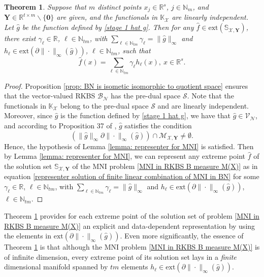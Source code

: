 \documentclass[11pt]{article}
\newtheorem{theorem}{Theorem}
\begin{document}
\begin{theorem}\label{theorem: direct representer theorem for MNI in BN}
Suppose that $m$ distinct points $x_j\in\mathbb{R}^s$, $j\in\mathbb{N}_m$, and $\mathbf{Y}\in\mathbb{R}^{t\times m}\backslash\{\mathbf{0}\}$ are given, and the functionals in $\mathbb{K}_\mathcal{X}$ are linearly independent. %
%
Let $\hat g$ be  the function defined by \eqref{stage 1 hat g}.
Then for any $\hat f\in\mathrm{ext}(\mathbb{S}_{\mathcal{X},\mathbf{Y}})$, there exist $\gamma_\ell\in\mathbb{R}$, $\ell\in\mathbb{N}_{tm}$, with  $\sum_{\ell\in\mathbb{N}_{tm}}\gamma_\ell=\|\hat g\|_{\infty}$ and $h_\ell\in\mathrm{ext}(\partial\|\cdot\|_\infty(\hat g))$, $\ell\in\mathbb{N}_{tm}$, such that 
    \begin{equation}\label{representer solution of finite linear combination of MNI in BN}
        \hat f(x)=\sum\limits_{\ell\in\mathbb{N}_{tm}}\gamma_\ell h_\ell(x),\ x\in\mathbb{R}^s.
    \end{equation}    
\end{theorem}
\begin{proof}
Proposition \ref{prop: BN is isometic isomorphic to quotient space} ensures that the vector-valued RKBS $\mathcal{B}_{\mathcal{N}}$ has the pre-dual space $\mathcal{S}$. Note that the functionals in $\mathbb{K}_\mathcal{X}$ belong to the pre-dual space $\mathcal{S}$ and are linearly independent. Moreover, since $\hat g$ is the function  defined by  \eqref{stage 1 hat g}, we have that $\hat g\in\mathcal{V}_{\mathcal{N}}$, and   according to Proposition 37 of \cite{wang2023sparse}, $\hat g$ satisfies the condition
\begin{equation}\label{non empty set: BN case}
(\|\hat g\|_{\infty}\partial\|\cdot\|_\infty(\hat g))\cap{\mathcal{M}}_{\mathcal{X},\mathbf{Y}}\neq\emptyset.
\end{equation} 
Hence, the hypothesis of Lemma \ref{lemma: representer for MNI} is satisfied. Then by Lemma \ref{lemma: representer for MNI}, we can represent any extreme point $\hat f$ of the solution set $\mathbb{S}_{\mathcal{X},\mathbf{Y}}$ of the MNI problem \eqref{MNI in RKBS B measure M(X)} as in equation \eqref{representer solution of finite linear combination of MNI in BN} for some $\gamma_\ell\in\mathbb{R}$, $\ell\in\mathbb{N}_{tm}$, with  $\sum_{\ell\in\mathbb{N}_{tm}}\gamma_\ell=\|\hat g\|_{\infty}$ and $h_\ell\in\mathrm{ext}(\partial\|\cdot\|_\infty(\hat g))$, $\ell\in\mathbb{N}_{tm}$.  
\end{proof}

Theorem \ref{theorem: direct representer theorem for MNI in BN} provides for each extreme point of the solution set of problem \eqref{MNI in RKBS B measure M(X)} an explicit and data-dependent representation by using the elements in $\mathrm{ext}(\partial\|\cdot\|_\infty(\hat g))$. Even more significantly, the essence of Theorem \ref{theorem: direct representer theorem for MNI in BN} is that although the MNI problem \eqref{MNI in RKBS B measure M(X)} is of infinite dimension, every extreme point of its solution set lays in a {\it finite} dimensional manifold spanned by $tm$ elements  $h_\ell\in\mathrm{ext}(\partial\|\cdot\|_\infty(\hat g))$.
\end{document}
